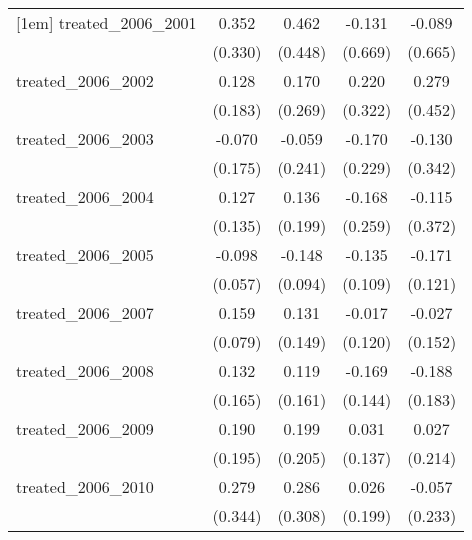 {\begin{tabular}{l*{4}{c}}
[1em]
treated\_2006\_2001&       0.352         &       0.462         &      -0.131         &      -0.089         \\
            &     (0.330)         &     (0.448)         &     (0.669)         &     (0.665)         \\
[1em]
treated\_2006\_2002&       0.128         &       0.170         &       0.220         &       0.279         \\
            &     (0.183)         &     (0.269)         &     (0.322)         &     (0.452)         \\
[1em]
treated\_2006\_2003&      -0.070         &      -0.059         &      -0.170         &      -0.130         \\
            &     (0.175)         &     (0.241)         &     (0.229)         &     (0.342)         \\
[1em]
treated\_2006\_2004&       0.127         &       0.136         &      -0.168         &      -0.115         \\
            &     (0.135)         &     (0.199)         &     (0.259)         &     (0.372)         \\
[1em]
treated\_2006\_2005&      -0.098         &      -0.148         &      -0.135         &      -0.171         \\
            &     (0.057)         &     (0.094)         &     (0.109)         &     (0.121)         \\
[1em]
treated\_2006\_2007&       0.159\sym{*}  &       0.131         &      -0.017         &      -0.027         \\
            &     (0.079)         &     (0.149)         &     (0.120)         &     (0.152)         \\
[1em]
treated\_2006\_2008&       0.132         &       0.119         &      -0.169         &      -0.188         \\
            &     (0.165)         &     (0.161)         &     (0.144)         &     (0.183)         \\
[1em]
treated\_2006\_2009&       0.190         &       0.199         &       0.031         &       0.027         \\
            &     (0.195)         &     (0.205)         &     (0.137)         &     (0.214)         \\
[1em]
treated\_2006\_2010&       0.279         &       0.286         &       0.026         &      -0.057         \\
            &     (0.344)         &     (0.308)         &     (0.199)         &     (0.233)         \\

\end{tabular}}
